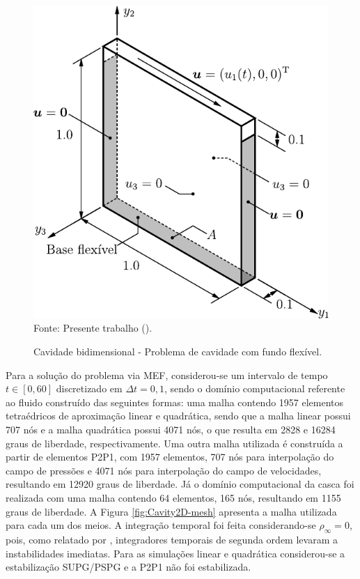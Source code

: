 \begin{figure}[h!]
    \centering
    \caption{Cavidade bidimensional - Problema de cavidade com fundo flexível.}
    \includegraphics[width=0.5\linewidth]{Figuras/FSI-Cavity2D/FSI-Cavity2D.pdf}
    \\Fonte: Presente trabalho (\the\year).
    \label{fig:cavity2D}
\end{figure}

Para a solução do problema via MEF, considerou-se um intervalo de tempo $t\in[0,60]$ discretizado em $\Delta t=0,1$, sendo o domínio computacional referente ao fluido construído das seguintes formas: uma malha contendo 1957 elementos tetraédricos de aproximação linear e quadrática, sendo que a malha linear possui 707 nós e a malha quadrática possui 4071 nós, o que resulta em 2828 e 16284 graus de liberdade, respectivamente. Uma outra malha utilizada é construída a partir de elementos P2P1, com 1957 elementos, 707 nós para interpolação do campo de pressões e 4071 nós para interpolação do campo de velocidades, resultando em 12920 graus de liberdade. Já o domínio computacional da casca foi realizada com uma malha contendo 64 elementos, 165 nós, resultando em 1155 graus de liberdade. A Figura \ref{fig:Cavity2D-mesh} apresenta a malha utilizada para cada um dos meios. A integração temporal foi feita considerando-se $\rho_\infty=0$, pois, como relatado por , integradores temporais de segunda ordem levaram a instabilidades imediatas. Para as simulações linear e quadrática considerou-se a estabilização SUPG/PSPG e a P2P1 não foi estabilizada.

